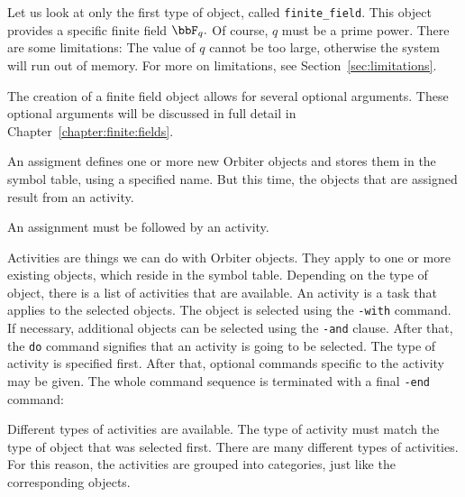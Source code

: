 Let us look at only the first type of object, called \verb'finite_field'.
This object provides a specific finite field $\bbF_q.$
Of course, $q$ must be a prime power. 
There are some limitations:
The value of $q$ cannot be too large, otherwise the system will run out of memory. 
For more on limitations, see Section~\ref{sec:limitations}.

\bigskip


The creation of a finite field object allows for several optional arguments. 
These optional arguments will be discussed 
in full detail in Chapter~\ref{chapter:finite:fields}.




An assigment defines one or more new Orbiter objects and stores them 
in the symbol table, using a specified name. 
But this time, the objects that are assigned result from an activity.







An assignment must be followed by an activity.


\bigskip


Activities are things we can do with Orbiter objects.
They apply to one or more existing objects, which reside in the symbol table.
Depending on the type of object, there is a list of activities that are available. 
An activity is a task that applies to the selected objects. 
The object is selected using the \verb'-with' command. 
If necessary, additional objects can be selected 
using the \verb'-and' clause. After that, the \verb'do' command signifies that an activity 
is going to be selected. 
The type of activity is specified first. 
After that, optional commands specific to the activity may be given. 
The whole command sequence is terminated  
with a final \verb'-end' command:  


Different types of activities are available. 
The type of activity must match the type of object that was selected first.
There are many different types of activities. For this reason, 
the activities are grouped into categories, 
just like the corresponding objects.




